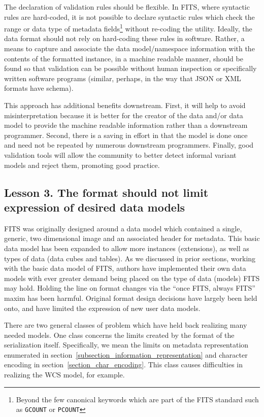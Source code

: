 \documentclass[final,authoryear,5p,times,twocolumn]{elsarticle}
\begin{document}
{{The declaration of validation rules should be flexible. In FITS,
where syntactic rules are hard-coded, it is not possible to
declare syntactic rules which check the range or data type of
metadata fields\footnote{Beyond the few canonical keywords
which are part of the FITS standard such as \texttt{GCOUNT} 
or \texttt{PCOUNT}} without re-coding the utility.
Ideally, the data format should not rely on hard-coding these rules
in software. Rather, a means to capture and associate the data
model/namespace information with the contents of the formatted
instance, in a machine readable manner, should be found so that
validation can be possible without human inspection or specifically
written software programs (similar, perhaps, in the way that JSON
or XML formats have schema).


This approach has additional benefits downstream. First, it will help 
to avoid misinterpretation because it is better for the creator
of the data and/or data model to provide the machine readable information rather
than a downstream programmer. Second, there is a saving in effort
in that the model is done once and need not be repeated by numerous
downstream programmers. Finally, good validation tools will allow the community
to better detect informal variant models and reject them, promoting good
practice.


\subsection{Lesson 3. The format should not limit expression of desired data models}

FITS was originally designed around a data model which contained a single, generic, 
two dimensional image and an associated header for metadata. This basic data model
has been expanded to allow more instances (extensions), as well as types of data 
(data cubes and tables). 
As we discussed in prior sections, working with the basic data model of FITS,
authors have implemented their own data models with ever greater demand being
placed on the type of data (models) FITS may hold.
Holding the line on format changes via the ``once FITS, always FITS'' maxim 
has been harmful.  Original format design decisions have largely been held onto, 
and have limited the expression of new user data models. 


There are two general classes of problem which have held back realizing
many needed models. One class concerns the limits created by the format
of the serialization itself. Specifically, we mean the limits on metadata 
representation enumerated in section~\ref{subsection_information_representation}
and character encoding in section~\ref{section_char_encoding}.
This class causes difficulties in realizing the WCS model, for example.


}}
\end{document}

